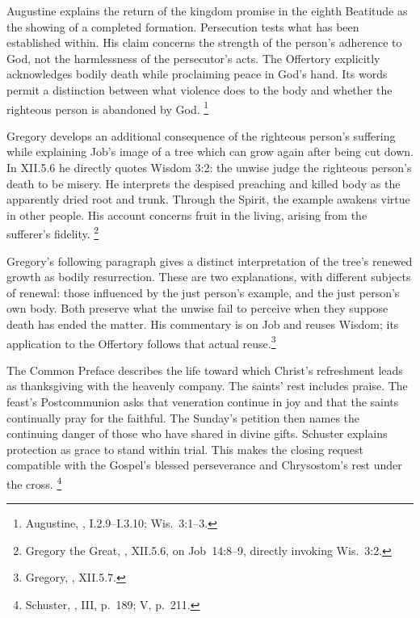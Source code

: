 Augustine explains the return of the kingdom promise in the eighth
Beatitude as the showing of a completed formation. Persecution
tests what has been established within. His claim concerns the
strength of the person's adherence to God, not the harmlessness
of the persecutor's acts. The Offertory explicitly acknowledges
bodily death while proclaiming peace in God's hand. Its words
permit a distinction between what violence does to the body
and whether the righteous person is abandoned by God.
\footnote{Augustine, , I.2.9--I.3.10;
Wis.~3:1--3.}

Gregory develops an additional consequence of the righteous person's
suffering while explaining Job's image of a tree which can grow
again after being cut down. In  XII.5.6 he directly
quotes Wisdom 3:2: the unwise judge the righteous person's death
to be misery. He interprets the despised preaching and killed
body as the apparently dried root and trunk. Through the Spirit,
the example awakens virtue in other people. His account concerns
fruit in the living, arising from the sufferer's fidelity.
\footnote{Gregory the Great, , XII.5.6,
on Job~14:8--9, directly invoking Wis.~3:2.}

Gregory's following paragraph gives a distinct interpretation of
the tree's renewed growth as bodily resurrection. These are two
explanations, with different subjects of renewal: those influenced
by the just person's example, and the just person's own body.
Both preserve what the unwise fail to perceive when they suppose
death has ended the matter. His commentary is on Job and reuses
Wisdom; its application to the Offertory follows that actual
reuse.\footnote{Gregory, , XII.5.7.}

The Common Preface describes the life toward which Christ's
refreshment leads as thanksgiving with the heavenly company.
The saints' rest includes praise. The feast's Postcommunion asks
that veneration continue in joy and that the saints continually
pray for the faithful. The Sunday's petition then names the
continuing danger of those who have shared in divine gifts.
Schuster explains protection as grace to stand within trial.
This makes the closing request compatible with the Gospel's
blessed perseverance and Chrysostom's rest under the cross.
\footnote{Schuster, , III, p.~189;
V, p.~211.}

